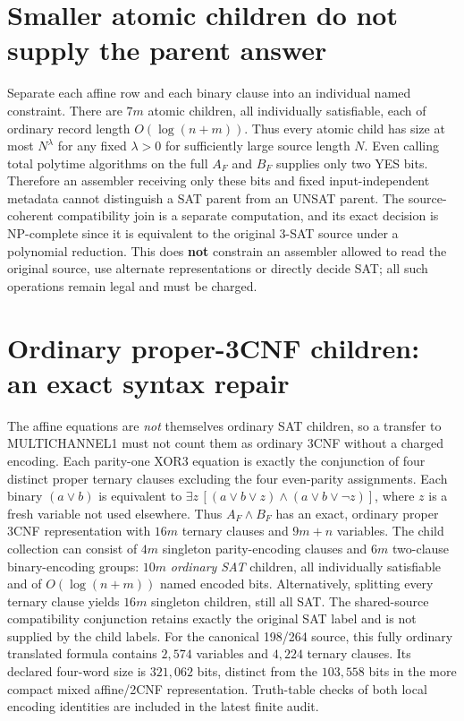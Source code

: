 \documentclass[11pt]{article}
\begin{document}
\section{Smaller atomic children do not supply the parent answer}
Separate each affine row and each binary clause into an individual named constraint. There are $7m$ atomic children, all individually satisfiable, each of ordinary record length $O(\log(n+m))$. Thus every atomic child has size at most $N^\lambda$ for any fixed $\lambda>0$ for sufficiently large source length $N$. Even calling total polytime algorithms on the full $A_F$ and $B_F$ supplies only two YES bits. Therefore an assembler receiving only these bits and fixed input-independent metadata cannot distinguish a SAT parent from an UNSAT parent. The source-coherent compatibility join is a separate computation, and its exact decision is NP-complete since it is equivalent to the original 3-SAT source under a polynomial reduction. This does \textbf{not} constrain an assembler allowed to read the original source, use alternate representations or directly decide SAT; all such operations remain legal and must be charged.

\section{Ordinary proper-3CNF children: an exact syntax repair}
The affine equations are \emph{not} themselves ordinary SAT children, so
a transfer to MULTICHANNEL1 must not count them as ordinary 3CNF
without a charged encoding. Each parity-one XOR3 equation is exactly
the conjunction of four distinct proper ternary clauses excluding
the four even-parity assignments. Each binary $(a\vee b)$ is equivalent
to $\exists z\,[(a\vee b\vee z)\wedge(a\vee b\vee\neg z)]$, where $z$
is a fresh variable not used elsewhere. Thus $A_F\wedge B_F$ has an
exact, ordinary proper 3CNF representation with $16m$ ternary clauses
and $9m+n$ variables. The child collection can consist of $4m$ singleton
parity-encoding clauses and $6m$ two-clause binary-encoding groups:
$10m$ \emph{ordinary SAT} children, all individually satisfiable and
of $O(\log(n+m))$ named encoded bits. Alternatively, splitting every
ternary clause yields $16m$ singleton children, still all SAT. The
shared-source compatibility conjunction retains exactly the original
SAT label and is not supplied by the child labels. For the canonical
198/264 source, this fully ordinary translated formula contains
$2{,}574$ variables and $4{,}224$ ternary clauses. Its declared
four-word size is $321{,}062$ bits, distinct from the $103{,}558$
bits in the more compact mixed affine/2CNF representation. Truth-table
checks of both local encoding identities are included in the
latest finite audit.
\end{document}
